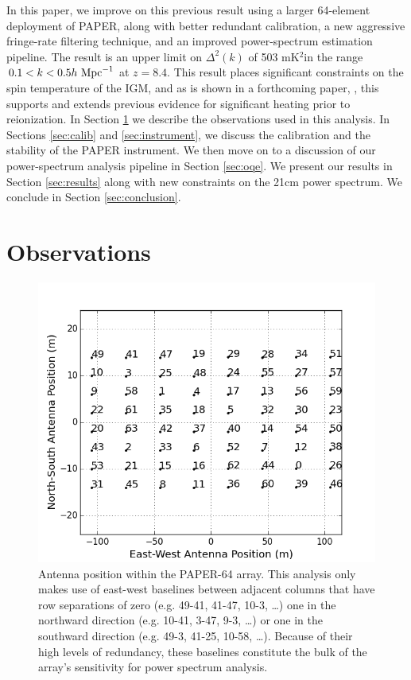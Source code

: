 \documentclass[twocolumn,numberedappendix]{emulateapj} \shorttitle{PSA64}
\newcommand{\hMpci}{h\ {\rm Mpc}^{-1}}
\newcommand{\mKsqlimit}{503 mK$^2$}
\begin{document}
In this paper, we improve on this previous result using
a larger 64-element deployment of PAPER, along with better redundant calibration, a new
aggressive fringe-rate filtering technique, and an improved power-spectrum estimation pipeline.
The result is an
upper limit on $\Delta^2(k)$ of \mKsqlimit in the range
$0.1<k<0.5\hMpci$ at $z=8.4$.  This result places significant constraints on the 
spin temperature of the IGM, and as is shown in a forthcoming paper,
\citet{pober_et_al2015}, this supports and extends
previous evidence for significant heating prior to
reionization.
In Section
\ref{sec:observations} we describe the observations used in this analysis. In
Sections \ref{sec:calib} and \ref{sec:instrument}, 
we discuss the calibration and 
the stability of the PAPER instrument.
We then move on to a discussion of our power-spectrum analysis pipeline in Section
\ref{sec:oqe}. 
We present our results in Section
\ref{sec:results} along with new constraints on the 21cm power spectrum.
We conclude in Section \ref{sec:conclusion}.



\section{Observations}\label{sec:observations}

\begin{figure}\centering
\includegraphics[width=\columnwidth]{plots/antenna_positions.png}
\caption{
Antenna position within the PAPER-64 array.
This analysis only makes use of
east-west baselines between adjacent columns that have row
separations of zero (e.g. 49-41, 41-47, 10-3, \dots)
one in the northward direction (e.g. 10-41, 3-47, 9-3, \dots) or
one in the southward direction (e.g. 49-3, 41-25, 10-58, \dots).
Because of their high levels of redundancy, 
these baselines constitute the bulk of the array's sensitivity for power
spectrum analysis.}
\label{fig:antenna_positions}
\end{figure}
\end{document}
